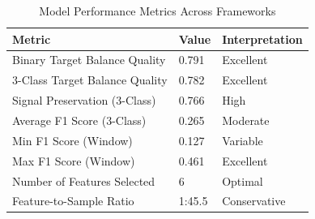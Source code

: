 \begin{table}
\caption{Model Performance Metrics Across Frameworks}
\label{tab:model_performance}
\begin{tabular}{lll}
\toprule
Metric & Value & Interpretation \\
\midrule
Binary Target Balance Quality & 0.791 & Excellent \\
3-Class Target Balance Quality & 0.782 & Excellent \\
Signal Preservation (3-Class) & 0.766 & High \\
Average F1 Score (3-Class) & 0.265 & Moderate \\
Min F1 Score (Window) & 0.127 & Variable \\
Max F1 Score (Window) & 0.461 & Excellent \\
Number of Features Selected & 6 & Optimal \\
Feature-to-Sample Ratio & 1:45.5 & Conservative \\
\bottomrule
\end{tabular}
\end{table}
